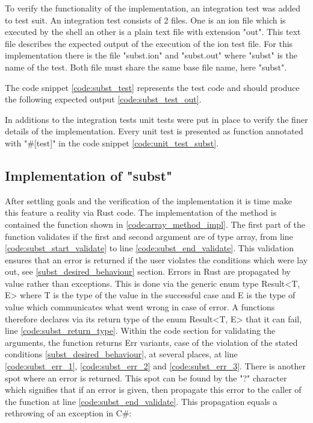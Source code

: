 To verify the functionality of the implementation, an integration test was added to test suit.
An integration test consists of 2 files. One is an ion file which is executed by the shell an other is a plain text file with extension "out".
This text file describes the expected output of the execution of the ion test file.
For this implementation there is the file "subst.ion" and "subst.out"
where "subst" is the name of the test. Both file must share the same base file name, here "subst".

The code snippet \ref{code:subst_test} represents the test code and should
produce the following expected output \ref{code:subst_test_out}.

In additions to the integration tests unit tests were put in place to verify the finer details of the implementation.
Every unit test is presented as function annotated with "\#[test]" in the code snippet \ref{code:unit_test_subst}.



\subsection{Implementation of "subst"}

After settling goals and the verification of the implementation it is time make this feature a reality via Rust code.
The implementation of the method is contained the function shown in \ref{code:array_method_impl}.
The first part of the function validates if the first and second argument are of type array,
from line \ref{code:subst_start_validate} to line \ref{code:subst_end_validate}.
This validation ensures that an error is returned if the user violates the conditions which were lay out, see \ref{subst_desired_behaviour} section.
Errors in Rust are propagated by value rather than exceptions. This is done via the generic enum type Result<T, E> where T is the type of the value in the successful case
and E is the type of value which communicates what went wrong in case of error.
A functions therefore declares via its return type of the enum Result<T, E> that it can fail, line \ref{code:subst_return_type}.
Within the code section for validating the arguments, the function returns Err variants, case of the violation of the stated conditions
\ref{subst_desired_behaviour}, at several places, at line \ref{code:subst_err_1}, \ref{code:subst_err_2} and \ref{code:subst_err_3}.
There is another spot where an error is returned. This spot can be found by the "?" character which signifies that if an error is given,
then propagate this error to the caller of the function at line \ref{code:subst_end_validate}.
This propagation equals a rethrowing of an exception in C\#:

